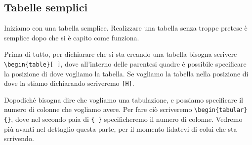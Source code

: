 \subsection{Tabelle semplici}

Iniziamo con una tabella semplice. Realizzare una tabella senza troppe pretese 
è semplice dopo che si è capito come funziona.

Prima di tutto, per dichiarare che si sta creando una tabella bisogna scrivere
\verb!\begin{table}[ ]!, dove all'interno delle parentesi quadre è possibile 
specificare la posizione di dove vogliamo la tabella. Se vogliamo la tabella 
nella posizione di dove la stiamo dichiarando scriveremo \verb![H]!.

Dopodiché bisogna dire che vogliamo una tabulazione, e possiamo specificare il 
numero di colonne che vogliamo avere. Per fare ciò scriveremo 
\verb!\begin{tabular}{}!, dove nel secondo paia di \verb!{ }! specificheremo il 
numero di colonne. Vedremo più avanti nel dettaglio questa parte, per il 
momento fidatevi di colui che sta scrivendo.